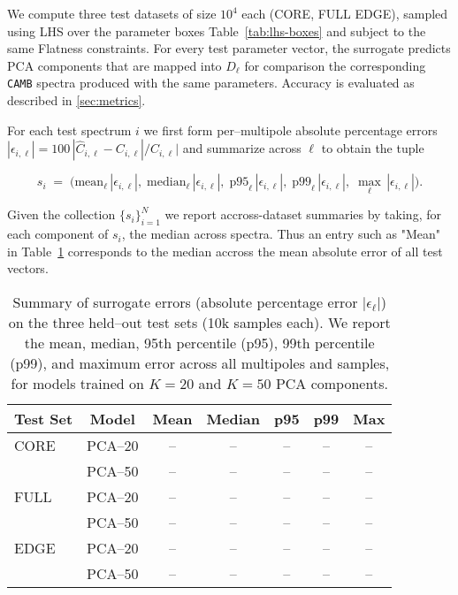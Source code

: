\documentclass[11pt,a4paper]{article}
\numberwithin{equation}{section}
\begin{document}
We compute three test datasets of size $10^4$ each (CORE, FULL EDGE), sampled using LHS over the parameter boxes Table~\ref{tab:lhs-boxes}
and subject to the same Flatness constraints.
For every test parameter vector, the surrogate predicts PCA components that are mapped into $D_\ell$ for comparison
the corresponding \texttt{CAMB} spectra produced with the same parameters.
Accuracy is evaluated as described in \cref{sec:metrics}.

For each test spectrum $i$ we first form per–multipole absolute percentage errors
$|\epsilon_{i,\ell}| = 100\,|\widehat{C}_{i,\ell} - C_{i,\ell}|/C_{i,\ell}|$
and summarize across $\ell$ to obtain the tuple

\[
s_i \;=\; \big(\mathrm{mean}_\ell\,|\epsilon_{i,\ell}|,\;
              \mathrm{median}_\ell\,|\epsilon_{i,\ell}|,\;
              \mathrm{p95}_\ell\,|\epsilon_{i,\ell}|,\;
              \mathrm{p99}_\ell\,|\epsilon_{i,\ell}|,\;
              \max_\ell\,|\epsilon_{i,\ell}|\big).
\]

Given the collection $\{s_i\}_{i=1}^{N}$ we report accross-dataset summaries by taking, for each component of $s_i$, the median across spectra.
Thus an entry such as "Mean" in Table~\ref{tab:test-summary} corresponds to the median accross the mean absolute error of all test vectors. 
 
\begin{table}[t]
\centering
\small
\caption{Summary of surrogate errors (absolute percentage error $|\epsilon_\ell|$) on the three held--out test sets (10k samples each).
We report the mean, median, 95th percentile (p95), 99th percentile (p99), and maximum error across all multipoles and samples, 
for models trained on $K=20$ and $K=50$ PCA components.}
\label{tab:test-summary}
\begin{tabular}{lcccccc}
\toprule
\textbf{Test Set} & \textbf{Model} 
& \textbf{Mean} & \textbf{Median} & \textbf{p95} & \textbf{p99} & \textbf{Max} \\
\midrule
CORE & PCA--20 & -- & -- & -- & -- & -- \\
     & PCA--50 & -- & -- & -- & -- & -- \\
\midrule
FULL & PCA--20 & -- & -- & -- & -- & -- \\
     & PCA--50 & -- & -- & -- & -- & -- \\
\midrule
EDGE & PCA--20 & -- & -- & -- & -- & -- \\
     & PCA--50 & -- & -- & -- & -- & -- \\
\bottomrule
\end{tabular}
\end{table}
\end{document}
